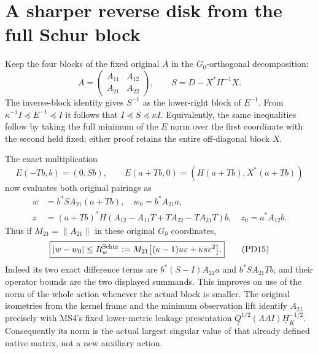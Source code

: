 \documentclass[11pt]{article}
\begin{document}
\section{A sharper reverse disk from the full Schur block}
Keep the four blocks of the fixed original $A$ in the $G_0$-orthogonal
decomposition:
\[
 A=\begin{pmatrix}A_{11}&A_{12}\\A_{21}&A_{22}\end{pmatrix},\qquad
 S=D-X^*H^{-1}X.                                                 \tag{PD13}
\]
The inverse-block identity gives $S^{-1}$ as the lower-right block
of $E^{-1}$.  From $\kappa^{-1}I\preceq E^{-1}\preceq I$ it follows
that $I\preceq S\preceq\kappa I$.  Equivalently, the same inequalities
follow by taking the full minimum of the $E$ norm over the first
coordinate with the second held fixed; either proof retains the
entire off-diagonal block $X$.

The exact multiplication
\[
 E(-Tb,b)=(0,Sb),\qquad
 E(a+Tb,0)=(H(a+Tb),X^*(a+Tb))
\]
now evaluates both original pairings as
\[
 \begin{split}
 w&=b^*S A_{21}(a+Tb),\quad w_0=b^*A_{21}a,\\
 z&=(a+Tb)^*H
       (A_{12}-A_{11}T+TA_{22}-TA_{21}T)b,
       \quad z_0=a^*A_{12}b.
 \end{split}                                                      \tag{PD14}
\]
Thus if $M_{21}=\|A_{21}\|$ in these original $G_0$ coordinates,
\[
 \boxed{|w-w_0|\le
 R_w^{\rm Schur}:=M_{21}\bigl[(\kappa-1)uv+\kappa s v^2\bigr].}
                                                                    \tag{PD15}
\]
Indeed its two exact difference terms are
$b^*(S-I)A_{21}a$ and $b^*SA_{21}Tb$, and their operator bounds
are the two displayed summands.  This improves on use of the
norm of the whole action whenever the actual block is smaller.
The original isometries from the kernel frame and the minimum
observation lift identify $A_{21}$ precisely with MS4's fixed
lower-metric leakage presentation
$\underline Q^{1/2}(\Lambda AI)\underline H_K^{-1/2}$.
Consequently its norm is the actual largest singular value of
that already defined native matrix, not a new auxiliary action.
\end{document}
